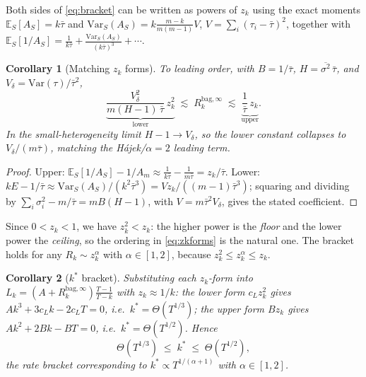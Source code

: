 \documentclass[11pt]{article}
\newcommand{\E}{\mathbb{E}}
\newcommand{\Var}{\mathrm{Var}}
\newcommand{\Rk}{R_k^{\mathrm{bag},\infty}}
\newtheorem{corollary}{Corollary}
\begin{document}
Both sides of \eqref{eq:bracket} can be written as powers of $z_k$ using the exact moments
$\E_S[A_S]=k\bar\tau$ and $\Var_S(A_S)=k\frac{m-k}{m(m-1)}V$, $V=\sum_i(\tau_i-\bar\tau)^2$,
together with $\E_S[1/A_S]=\frac1{k\bar\tau}+\frac{\Var_S(A_S)}{(k\bar\tau)^3}+\cdots$.

\begin{corollary}[Matching $z_k$ forms]\label{cor:zk}
To leading order, with $B=1/\bar\tau$, $H=\overline{\sigma^2}\,\bar\tau$, and
$V_\delta=\Var(\tau)/\bar\tau^2$,
\begin{equation}\label{eq:zkforms}
  \underbrace{\frac{V_\delta^2}{m(H-1)\,\bar\tau}\,z_k^2}_{\text{lower}}
  \;\lesssim\;\Rk\;\lesssim\;
  \underbrace{\frac{1}{\bar\tau}\,z_k}_{\text{upper}} .
\end{equation}
In the small-heterogeneity limit $H-1\to V_\delta$, so the lower constant collapses to
$V_\delta/(m\bar\tau)$, matching the H\'ajek/$\alpha=2$ leading term.
\end{corollary}
\begin{proof}
Upper: $\E_S[1/A_S]-1/A_m\approx\frac1{k\bar\tau}-\frac1{m\bar\tau}=z_k/\bar\tau$.
Lower: $kE-1/\bar\tau\approx\Var_S(A_S)/(k^2\bar\tau^3)=Vz_k/((m-1)\bar\tau^3)$; squaring and
dividing by $\sum_i\sigma_i^2-m/\bar\tau=mB(H-1)$, with $V=m\bar\tau^2V_\delta$, gives the
stated coefficient.
\end{proof}

Since $0<z_k<1$, we have $z_k^2<z_k$: the higher power is the \emph{floor} and the lower power
the \emph{ceiling}, so the ordering in \eqref{eq:zkforms} is the natural one. The bracket
holds for any $R_k\sim z_k^\alpha$ with $\alpha\in[1,2]$, because $z_k^2\le z_k^\alpha\le z_k$.

\begin{corollary}[$k^*$ bracket]\label{cor:kstar}
Substituting each $z_k$-form into $L_k=(A+\Rk)\frac{T-1}{T-k}$ with $z_k\approx1/k$:
the lower form $c_Lz_k^2$ gives $Ak^3+3c_Lk-2c_LT=0$, i.e.\ $k^*=\Theta(T^{1/3})$;
the upper form $Bz_k$ gives $Ak^2+2Bk-BT=0$, i.e.\ $k^*=\Theta(T^{1/2})$. Hence
\[
  \Theta(T^{1/3})\;\le\;k^*\;\le\;\Theta(T^{1/2}),
\]
the rate bracket corresponding to $k^*\propto T^{1/(\alpha+1)}$ with $\alpha\in[1,2]$.
\end{corollary}

\end{document}
